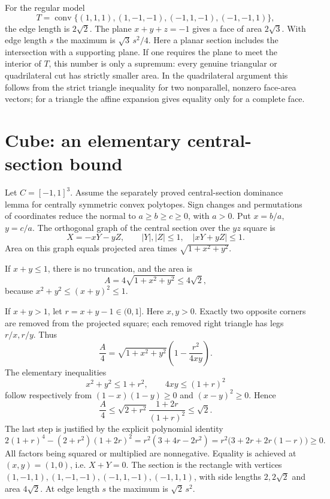 For the regular model
\[
 T=\operatorname{conv}\{(1,1,1),(1,-1,-1),(-1,1,-1),(-1,-1,1)\},
\]
the edge length is $2\sqrt2$.  The plane $x+y+z=-1$ gives a face of
area $2\sqrt3$.  With edge length $s$ the maximum is
$\sqrt3\,s^2/4$.
Here a planar section includes the intersection with a supporting
plane.  If one requires the plane to meet the interior of $T$, this
number is only a supremum: every genuine triangular or quadrilateral
cut has strictly smaller area.  In the quadrilateral argument this
follows from the strict triangle inequality for two nonparallel,
nonzero face-area vectors; for a triangle the affine expansion gives
equality only for a complete face.

\section{Cube: an elementary central-section bound}
Let $C=[-1,1]^3$.  Assume the separately proved central-section
dominance lemma for centrally symmetric convex polytopes.  Sign changes
and permutations of coordinates reduce the normal to
$a\ge b\ge c\ge0$, with $a>0$.  Put $x=b/a$, $y=c/a$.
The orthogonal graph of the central section over the $yz$ square is
\[
 X=-xY-yZ,\qquad |Y|,|Z|\le1,\quad |xY+yZ|\le1.
\]
Area on this graph equals projected area times
$\sqrt{1+x^2+y^2}$.

If $x+y\le1$, there is no truncation, and the area is
\[
 A=4\sqrt{1+x^2+y^2}\le4\sqrt2,
\]
because $x^2+y^2\le(x+y)^2\le1$.

If $x+y>1$, let $r=x+y-1\in(0,1]$.  Here $x,y>0$.
Exactly two opposite corners are removed from the projected square;
each removed right triangle has legs $r/x,r/y$.  Thus
\[
 \frac A4=\sqrt{1+x^2+y^2}\left(1-\frac{r^2}{4xy}\right).
\]
The elementary inequalities
\[
 x^2+y^2\le1+r^2,\qquad 4xy\le(1+r)^2
\]
follow respectively from $(1-x)(1-y)\ge0$ and $(x-y)^2\ge0$.
Hence
\[
 \frac A4\le\sqrt{2+r^2}\frac{1+2r}{(1+r)^2}\le\sqrt2.
\]
The last step is justified by the explicit polynomial identity
\[
 2(1+r)^4-(2+r^2)(1+2r)^2
 =r^2(3+4r-2r^2)
 =r^2\bigl(3+2r+2r(1-r)\bigr)\ge0.
\]
All factors being squared or multiplied are nonnegative.
Equality is achieved at $(x,y)=(1,0)$, i.e. $X+Y=0$.
The section is the rectangle with vertices
$(1,-1,1),(1,-1,-1),(-1,1,-1),(-1,1,1)$,
with side lengths $2,2\sqrt2$ and area $4\sqrt2$.
At edge length $s$ the maximum is $\sqrt2\,s^2$.

